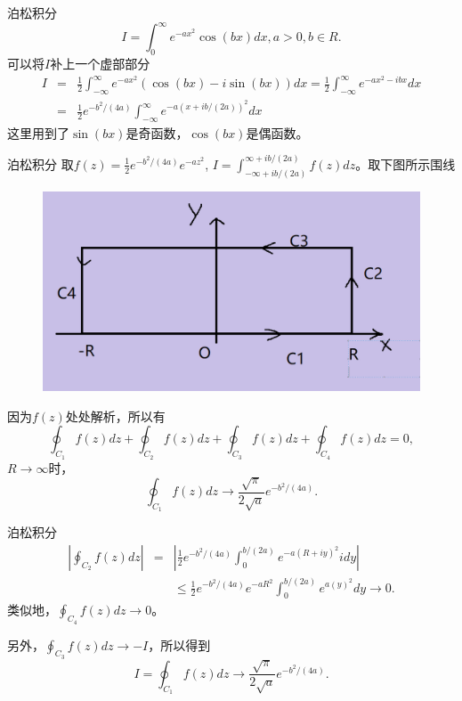 \documentclass[11pt]{beamer}
\begin{document}
\begin{frame}{泊松积分}
\begin{equation}
I = \int^\infty_0 e^{-ax^2} \cos(bx) dx, a>0, b\in R.
\end{equation}
可以将$I$补上一个虚部部分
\begin{eqnarray}
I &=& \frac{1}{2}\int^\infty_{-\infty} e^{-ax^2} (\cos(bx) - i \sin(bx)) dx
 = \frac{1}{2}\int^\infty_{-\infty} e^{-ax^2 - ibx} dx
\nonumber\\
&=& \frac{1}{2}e^{-b^2/(4a)} \int^\infty_{-\infty} e^{-a(x+ib/(2a))^2} dx
\end{eqnarray}
这里用到了$\sin(bx)$是奇函数，$\cos(bx)$是偶函数。

\end{frame}

\begin{frame}{泊松积分}
取$f(z) = \frac{1}{2}e^{-b^2/(4a)} e^{-az^2}$, $I = \int^{\infty + ib/(2a)}_{-\infty+ib/(2a)} f(z) dz$。取下图所示围线
\begin{figure}
\centering
\includegraphics[width=0.5\linewidth]{chap5泊松积分}
\label{fig:chap5泊松积分}
\end{figure}
因为$f(z)$处处解析，所以有
\begin{equation}
\oint_{C_1}f(z) dz + \oint_{C_2}f(z)dz + \oint_{C_3}f(z)dz + \oint_{C_4}f(z) dz = 0,
\end{equation}
$R \rightarrow \infty$时，
\begin{equation}
\oint_{C_1}f(z) dz \rightarrow \frac{\sqrt{\pi}}{2\sqrt{a}}e^{-b^2/(4a)}.
\end{equation}
\end{frame}

\begin{frame}{泊松积分}
\begin{eqnarray}
|\oint_{C_2} f(z) dz| &=& |\frac{1}{2}e^{-b^2/(4a)} \int^{b/(2a)}_0 e^{-a(R+iy)^2} idy|
\nonumber\\
&& \leq \frac{1}{2}e^{-b^2/(4a)} e^{-aR^2} \int^{b/(2a)}_0
e^{a(y)^2} dy \rightarrow 0.
\end{eqnarray}
类似地，$\oint_{C_4}f(z)dz \rightarrow 0$。

另外，$\oint_{C_3}f(z)dz \rightarrow -I$，所以得到
\begin{equation}
I = \oint_{C_1}f(z) dz \rightarrow \frac{\sqrt{\pi}}{2\sqrt{a}}e^{-b^2/(4a)}.
\end{equation}

\end{frame}
\end{document}
